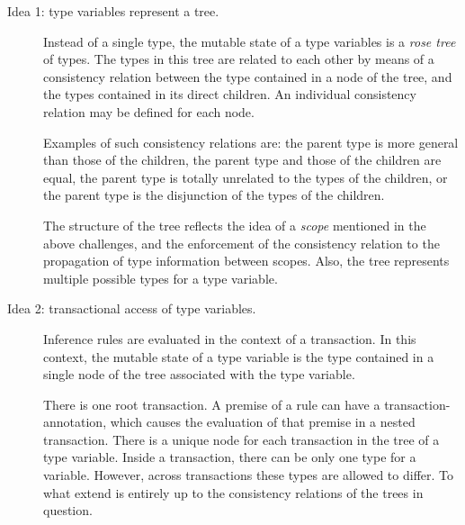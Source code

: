\documentclass[preprint,natbib]{sigplanconf}
\begin{document}
  
  
  
  \begin{description}
    \item[Idea 1: type variables represent a tree.]
      Instead of a single type, the mutable state of a type variables is a
      \emph{rose tree} of types. The types in this tree are related to each
      other by means of a consistency relation between the type contained in
      a node of the tree, and the types contained in its direct children. An
      individual consistency relation may be defined for each node.

      Examples of such consistency relations are: the parent type is more
      general than those of the children, the parent type and those of the
      children are equal, the parent type is totally unrelated to the types
      of the children, or the parent type is the disjunction of the types of
      the children.

      The structure of the tree reflects the idea of a \emph{scope} mentioned in
      the above challenges, and the enforcement of the consistency relation to
      the propagation of type information between scopes. Also, the tree
      represents multiple possible types for a type variable.
    \item[Idea 2: transactional access of type variables.]
      Inference rules are evaluated in the context of a transaction. In this
      context, the mutable state of a type variable is the type contained in a
      single node of the tree associated with the type variable.

      There is one root transaction. A premise of a rule can have a
      transaction-annotation, which causes the evaluation of that premise in
      a nested transaction. There is a unique node for each transaction in the
      tree of a type variable. Inside a transaction, there can be only one type
      for a variable. However, across transactions these types are allowed to
      differ. To what extend is entirely up to the consistency relations of the
      trees in question.


\end{description}
\end{document}
